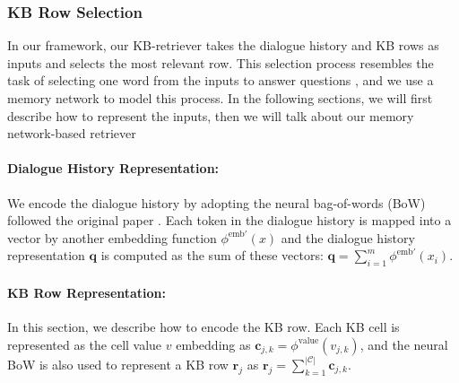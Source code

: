 \documentclass[11pt,a4paper]{article}
\begin{document}
\subsubsection{KB Row Selection}\label{model:row_retriever}
In our framework, our KB-retriever takes the dialogue history and KB rows as inputs and selects the most
 relevant row. This selection process resembles the task of selecting one word from 
 the inputs to answer questions \cite{sukhbaatar2015end}, and we use a memory network to model this process.
In the following sections, we will first describe how to represent the inputs, then we will talk about our memory network-based retriever

\paragraph{Dialogue History Representation:}
We encode the dialogue history by adopting the neural bag-of-words (BoW) followed the original paper \cite{sukhbaatar2015end}.
Each token in the dialogue history is mapped into a vector by another embedding function $\phi^{\text{emb}'}(x)$ 
and the dialogue history representation $\mathbf{q}$ is computed as the sum of these vectors:
$\mathbf{q} = \sum ^{m}_{i=1} \phi^{\text{emb}'} (x_{i}) $.

\paragraph{KB Row Representation:}
In this section, we describe how to encode the KB row. 
Each KB cell is represented as the 
cell value $v$ embedding as $\mathbf{c}_{j, k} = \phi^{\text{value}}(v_{j, k})$,
and the neural BoW is also used 
to represent a KB row $\mathbf{r}_{j}$ as
$\mathbf{r}_{j} = \sum_{k=1}^{|\mathcal{C}|} \mathbf{c}_{j,k}$.
\end{document}
